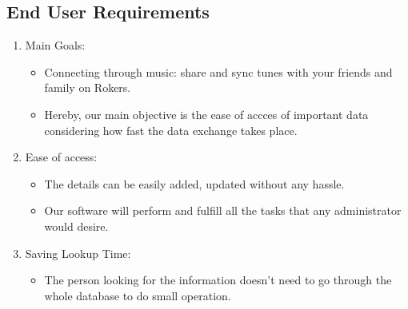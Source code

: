 \thispagestyle{fancy}

\subsection{End User Requirements}
\begin{enumerate}
\item Main Goals:
	\begin{itemize}
	\item Connecting through music: share and sync tunes with your friends and family on Rokers.
	\item Hereby, our main objective is the ease of accces of important data considering how fast the data exchange takes place.
	\end{itemize}
\item Ease of access:
	\begin{itemize}
	\item The details can be easily added, updated without any hassle.
	\item Our software will perform and fulfill all the tasks that any administrator would desire.
	\end{itemize}		
\item Saving Lookup Time:
	\begin{itemize}
	\item The person looking for the information doesn't need to go through the whole database to do small operation.	\end{itemize}
\end{enumerate}
\thispagestyle{fancy}

